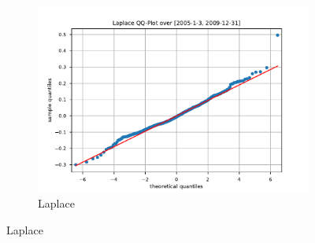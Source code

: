 \begin{figure}[htbp]
\begin{subfigure}[b]{0.32\textwidth}
        \includegraphics[width=\textwidth]{content/reschap4/Figures/laplace_QQ_2005-1-3-2009-12-31.pdf}
        \caption{Laplace}
    \end{subfigure}


\end{figure}
